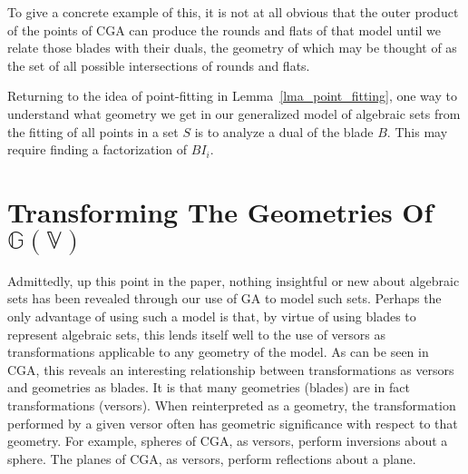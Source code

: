 \documentclass{birkjour}
\theoremstyle{definition}
\theoremstyle{remark}
\numberwithin{equation}{section}
\newcommand{\G}{\mathbb{G}}
\newcommand{\V}{\mathbb{V}}
\begin{document}
To give a concrete example of this, it is not at all obvious that the
outer product of the points of CGA can produce the rounds and flats of
that model until we relate those blades with their duals, the geometry
of which may be thought of as the set of all possible intersections of rounds and flats.

Returning to the idea of point-fitting in Lemma~\ref{lma_point_fitting}, one way to understand
what geometry we get in our generalized model of algebraic sets
from the fitting of all points in a set $S$ is to analyze a dual of the
blade $B$.  This may require finding a factorization of $BI_i$.

\section{Transforming The Geometries Of $\G(\V)$}

Admittedly, up this point in the paper, nothing insightful or new about
algebraic sets has been revealed through our use of GA to model
such sets.  Perhaps the only advantage of using such a model
is that, by virtue of using blades to represent algebraic sets,
this lends itself well to the use of versors as transformations
applicable to any geometry of the model.  As can be seen
in CGA, this reveals an interesting relationship
between transformations as versors and geometries as blades.
It is that many geometries (blades) are in fact transformations (versors).
When reinterpreted as a geometry, the transformation performed by a given versor
often has geometric significance with respect to that geometry.
For example, spheres of CGA, as versors, perform inversions about
a sphere.  The planes of CGA, as versors, perform reflections about
a plane.
\end{document}
